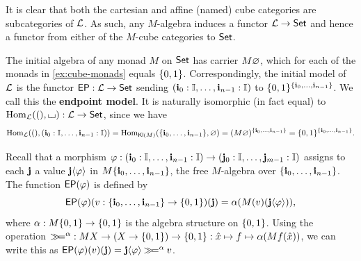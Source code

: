 \documentclass[a4paper]{memoir}
\begin{document}
It is clear that both the cartesian and affine (named) cube categories are subcategories of $\catL$.
As such, any $M$-algebra induces a functor $\catL \to \Set$ and hence a functor from either of the $M$-cube categories to $\Set$.

The initial algebra of any monad $M$ on $\Set$ has carrier $M \eset$, which for each of the monads in \cref{ex:cube-monads} equals $\accol{0, 1}$.
Correspondingly, the initial model of $\catL$ is the functor $\EP : \catL \to \Set$ sending $(\dm{i}_0 : \IX, \ldots, \dm{i}_{n-1} : \IX)$ to $\accol{0, 1}^{\accol{\dm{i}_0, \ldots, \dm{i}_{n-1}}}$.
We call this the \textbf{endpoint model}.
It is naturally isomorphic (in fact equal) to $\Hom_\catL((), \loch) : \catL \to \Set$, since we have
\small \[
	\Hom_\catL((), (\dm{i}_0 : \IX, \ldots, \dm{i}_{n-1} : \IX))
	= \Hom_{\Kleisli(M)}(\accol{\dm{i}_0, \ldots, \dm{i}_{n-1}}, \eset)
	= (M\eset)^{\accol{\dm{i}_0, \ldots, \dm{i}_{n-1}}}
	= \accol{0, 1}^{\accol{\dm{i}_0, \ldots, \dm{i}_{n-1}}}.
\] \normalsize


Recall that a morphism $\vfi : (\dm{i}_0 : \IX, \ldots, \dm{i}_{n-1} : \IX) \to (\dm{j}_0 : \IX, \ldots, \dm{j}_{m-1} : \IX)$ assigns to each $\dm j$ a value $\dm j\psub \vfi$ in $M \accol{\dm{i}_0, \ldots, \dm{i}_{n-1}}$, the free $M$-algebra over $\accol{\dm{i}_0, \ldots, \dm{i}_{n-1}}$.
The function $\EP(\vfi)$ is defined by
\[
	\EP(\vfi)
	\paren{ v : {\accol{\dm{i}_0, \ldots, \dm{i}_{n-1}} \to \accol{0, 1}} }
	(\dm j)
	= \alpha\paren{ M(v)(\dm j \psub \vfi) },
\]
where $\alpha : M\accol{0, 1} \to \accol{0, 1}$ is the algebra structure on $\accol{0, 1}$.
Using the operation $\bindop^\alpha : MX \to (X \to \accol{0, 1}) \to \accol{0, 1} : \hat x \mapsto f \mapsto \alpha (Mf(\hat x))$, we can write this as $\EP(\vfi)(v)(\dm j) = \dm j \psub \vfi \bindop^\alpha v$.
\end{document}
